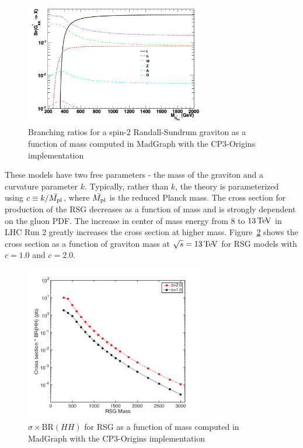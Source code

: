 \begin{figure}[h!]
  \centering
  \captionsetup{justification=centering}

  \includegraphics[width=0.7\textwidth]{figures/G_BR}
   \caption{Branching ratios for a spin-2 Randall-Sundrum graviton as a function of mass computed in MadGraph with the CP3-Origins implementation~\cite{RSG_LHC,MadGraph,CP3Origins}}
  \label{fig:G_BR}
\end{figure}

These models have two free parameters - the mass of the graviton and a curvature parameter $k$. Typically, rather than $k$, the theory is parameterized using $c \equiv k/\bar{M_{\rm pl}}$, where $\bar{M_{\rm pl}}$ is the reduced Planck mass. The cross section for production of the RSG decreases as a function of mass and is strongly dependent on the gluon PDF. The increase in center of mass energy from $8$ to $13 \TeV$ in LHC Run 2 greatly increases the cross section at higher mass. Figure~\ref{fig:G_xsec} shows the cross section as a function of graviton mass at $\sqrt{s} = 13 \TeV$ for RSG models with $c=1.0$ and $c=2.0$. 

\begin{figure}[h!]
  \centering
  \captionsetup{justification=centering}

  \includegraphics[width=0.7\textwidth]{figures/RSG_xsec}
   \caption{$\sigma \times \textrm{BR}(HH)$ for RSG as a function of mass computed in MadGraph with the CP3-Origins implementation~\cite{RSG_LHC,MadGraph,CP3Origins}}
  \label{fig:G_xsec}
\end{figure}

